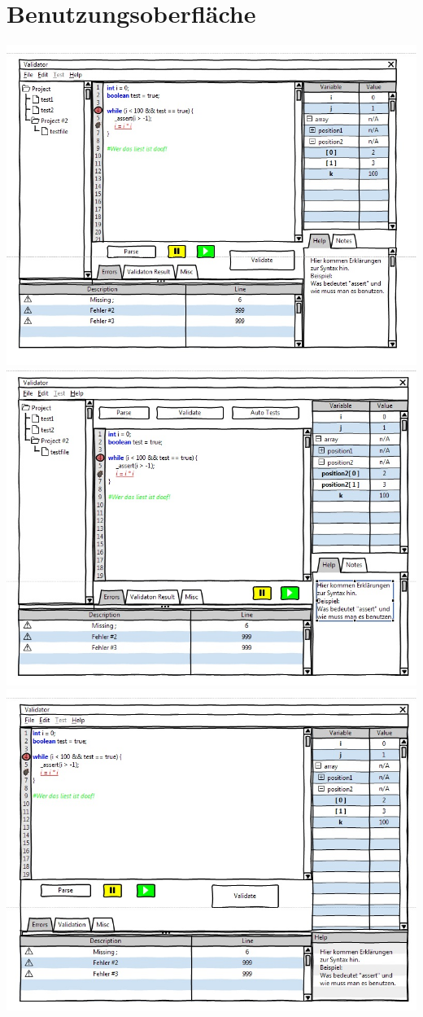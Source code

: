 \documentclass[a4paper,10pt]{article}
\begin{document}
\section{Benutzungsoberfläche}
\includegraphics{images/mockup1.jpg}
\includegraphics{images/mockup2.jpg}
\includegraphics{images/mockup3.jpg}
\end{document}
